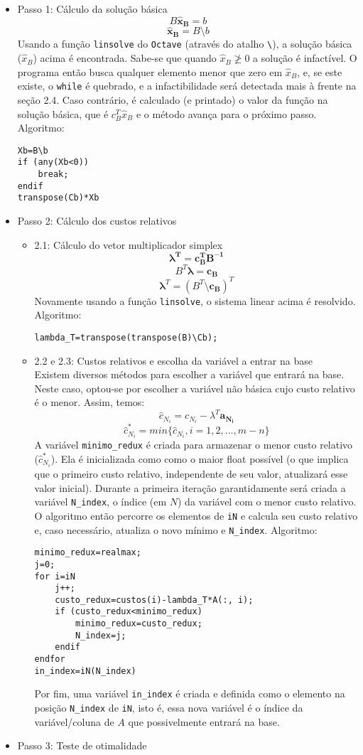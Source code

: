 \documentclass[]{article}
\begin{document}
	\begin{itemize}
		\item Passo 1: Cálculo da solução básica
\[
B\mathbf{\hat{x}_B}
=
b
\]
\[
\mathbf{\hat{x}_B} = B \setminus b
\]
Usando a função \verb+linsolve+ do \verb+Octave+ (através do atalho \verb+\+), a solução básica ($\hat{x}_B$) acima é encontrada. Sabe-se que quando $\hat{x}_B \ngeq 0$ a solução é infactível. O programa então busca qualquer elemento menor que zero em $\hat{x}_B$, e, se este existe, o \verb+while+ é quebrado, e a infactibilidade será detectada mais à frente na seção 2.4. Caso contrário, é calculado (e printado) o valor da função na solução básica, que é $c_{B}^T\hat{x}_B$ e o método avança para o próximo passo. Algoritmo:

\begin{lstlisting}
Xb=B\b    		
if (any(Xb<0))
    break;
endif
transpose(Cb)*Xb
\end{lstlisting}

		\item Passo 2: Cálculo dos custos relativos
		\begin{itemize}
\item 2.1: Cálculo do vetor multiplicador simplex
\[
\mathbf{\lambda^T}=\mathbf{c_B^TB^{-1}}
\]
\[
B^T \mathbf{\lambda}=\mathbf{c_B}
\]
\[
\mathbf{\lambda}^T=(B^T \setminus \mathbf{c_B})^T
\]
Novamente usando a função \verb+linsolve+, o sistema linear acima é resolvido. Algoritmo: 
\begin{lstlisting}
lambda_T=transpose(transpose(B)\Cb);
\end{lstlisting}

\item 2.2 e 2.3: Custos relativos e escolha da variável a entrar na base\\
Existem diversos métodos para escolher a variável que entrará na base. Neste caso, optou-se por escolher a variável não básica cujo custo relativo é o menor. Assim, temos:
\[
\hat{c}_{N_i}=c_{N_i}-\lambda^T\mathbf{a_{N_i}}
\]
\[
\hat{c}_{N_i}^*=min\{ \hat{c}_{N_i}, i=1,2,...,m-n\}
\]
A variável \verb+minimo_redux+ é criada para armazenar o menor custo relativo ($\hat{c}_{N_i}^*$). Ela é inicializada como como o maior float possível (o que implica que o primeiro custo relativo, independente de seu valor, atualizará esse valor inicial). Durante a primeira iteração garantidamente será criada a variável \verb+N_index+, o índice (em $N$) da variável com o menor custo relativo. O algoritmo então percorre os elementos de \verb+iN+ e calcula seu custo relativo e, caso necessário, atualiza o novo mínimo e \verb+N_index+. Algoritmo:
\begin{lstlisting}
minimo_redux=realmax;
j=0;     
for i=iN
    j++;
    custo_redux=custos(i)-lambda_T*A(:, i);
    if (custo_redux<minimo_redux)
        minimo_redux=custo_redux;
        N_index=j;
    endif
endfor
in_index=iN(N_index)
\end{lstlisting}
Por fim, uma variável \verb+in_index+ é criada e definida como o elemento na posição \verb+N_index+ de \verb+iN+, isto é, essa nova variável é o índice da variável/coluna de $A$ que possivelmente entrará na base.
\end{itemize}
		\item Passo 3: Teste de otimalidade
		

\end{itemize}
\end{document}
